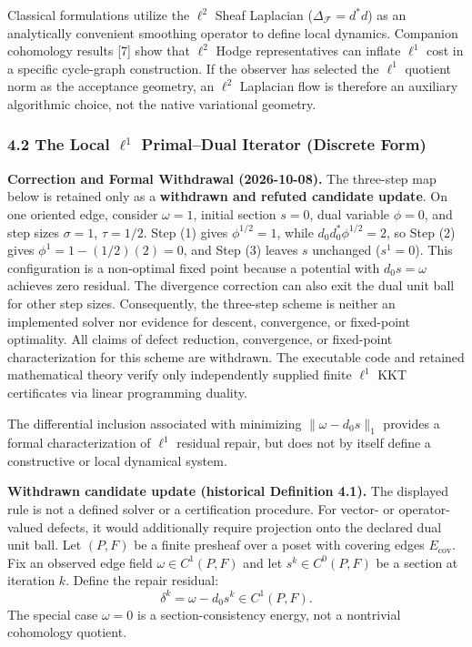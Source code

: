 \documentclass[
]{article}
\renewenvironment{quote}
  {\begin{leftbar}\small}
  {\end{leftbar}}
\begin{document}
Classical formulations utilize the \(\ell^2\) Sheaf Laplacian (\(\Delta_{\mathcal{F}} = d^*d\)) as an analytically convenient smoothing operator to define local dynamics. Companion cohomology results {[}7{]} show that \(\ell^2\) Hodge representatives can inflate \(\ell^1\) cost in a specific cycle-graph construction. If the observer has selected the \(\ell^1\) quotient norm as the acceptance geometry, an \(\ell^2\) Laplacian flow is therefore an auxiliary algorithmic choice, not the native variational geometry.

\subsubsection{\texorpdfstring{4.2 The Local \(\ell^1\) Primal--Dual Iterator (Discrete Form)}{4.2 The Local \textbackslash ell\^{}1 Primal--Dual Iterator (Discrete Form)}}\label{the-local-ell1-primaldual-iterator-discrete-form}

\begin{quote}
\textbf{Correction and Formal Withdrawal (2026-10-08).} The three-step map below is retained only as a \textbf{withdrawn and refuted candidate update}. On one oriented edge, consider \(\omega=1\), initial section \(s=0\), dual variable \(\phi=0\), and step sizes \(\sigma=1\), \(\tau=1/2\). Step (1) gives \(\phi^{1/2}=1\), while \(d_0d_0^*\phi^{1/2}=2\), so Step (2) gives \(\phi^1 = 1 - (1/2)(2) = 0\), and Step (3) leaves \(s\) unchanged (\(s^1 = 0\)). This configuration is a non-optimal fixed point because a potential with \(d_0 s = \omega\) achieves zero residual. The divergence correction can also exit the dual unit ball for other step sizes. Consequently, the three-step scheme is neither an implemented solver nor evidence for descent, convergence, or fixed-point optimality. All claims of defect reduction, convergence, or fixed-point characterization for this scheme are withdrawn. The executable code and retained mathematical theory verify only independently supplied finite \(\ell^1\) KKT certificates via linear programming duality.
\end{quote}

The differential inclusion associated with minimizing \(\|\omega-d_0s\|_1\) provides a formal characterization of \(\ell^1\) residual repair, but does not by itself define a constructive or local dynamical system.

\textbf{Withdrawn candidate update (historical Definition 4.1).} The displayed rule is not a defined solver or a certification procedure. For vector- or operator-valued defects, it would additionally require projection onto the declared dual unit ball.
Let \((P, F)\) be a finite presheaf over a poset with covering edges \(E_{\mathrm{cov}}\). Fix an observed edge field \(\omega \in C^1(P,F)\) and let \(s^k \in C^0(P, F)\) be a section at iteration \(k\). Define the repair residual:
\[ \delta^k = \omega - d_0 s^k \in C^1(P, F). \]
The special case \(\omega=0\) is a section-consistency energy, not a nontrivial cohomology quotient.
\end{document}

